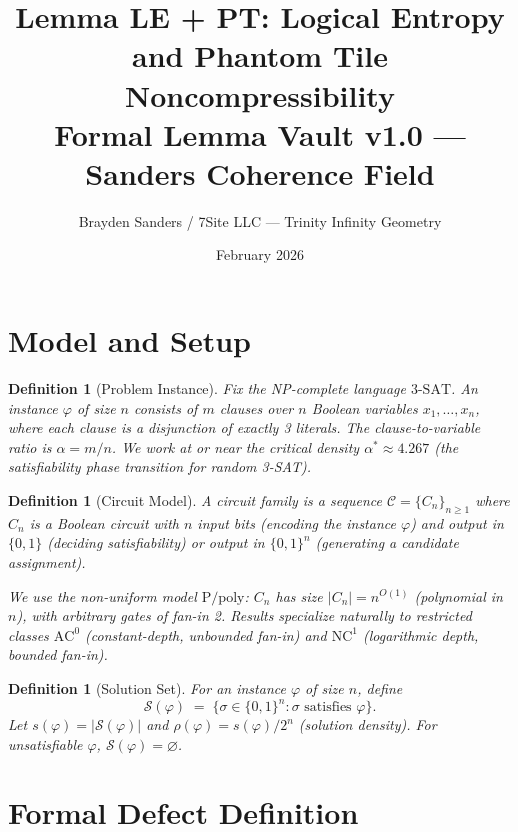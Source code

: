 \documentclass[11pt]{article}
\title{%
  Lemma LE + PT: Logical Entropy and Phantom Tile Noncompressibility\\[4pt]
  \large Formal Lemma Vault v1.0 --- Sanders Coherence Field}
\author{Brayden Sanders / 7Site LLC --- Trinity Infinity Geometry}
\date{February 2026}
\newtheorem{definition}[lemma]{Definition}
\theoremstyle{definition}
\begin{document}
\maketitle

\section{Model and Setup}

\begin{definition}[Problem Instance]
\label{def:instance}
Fix the NP-complete language $\mathrm{3\text{-}SAT}$.
An instance $\varphi$ of size $n$ consists of $m$ clauses over $n$ Boolean variables $x_1, \ldots, x_n$,
where each clause is a disjunction of exactly 3 literals.
The clause-to-variable ratio is $\alpha = m/n$.
We work at or near the critical density $\alpha^* \approx 4.267$ (the satisfiability phase transition for random 3-SAT).
\end{definition}

\begin{definition}[Circuit Model]
\label{def:circuit}
A \emph{circuit family} is a sequence $\mathcal{C} = \{C_n\}_{n \geq 1}$ where $C_n$ is a Boolean circuit
with $n$ input bits (encoding the instance $\varphi$) and output in $\{0,1\}$ (deciding satisfiability)
or output in $\{0,1\}^n$ (generating a candidate assignment).

We use the non-uniform model $\mathrm{P/poly}$: $C_n$ has size $|C_n| = n^{O(1)}$ (polynomial in $n$),
with arbitrary gates of fan-in 2.
Results specialize naturally to restricted classes $\mathrm{AC}^0$ (constant-depth, unbounded fan-in)
and $\mathrm{NC}^1$ (logarithmic depth, bounded fan-in).
\end{definition}

\begin{definition}[Solution Set]
\label{def:solset}
For an instance $\varphi$ of size $n$, define
\[
  \mathcal{S}(\varphi) \;=\; \bigl\{ \sigma \in \{0,1\}^n : \sigma \text{ satisfies } \varphi \bigr\}.
\]
Let $s(\varphi) = |\mathcal{S}(\varphi)|$ and $\rho(\varphi) = s(\varphi) / 2^n$ (solution density).
For unsatisfiable $\varphi$, $\mathcal{S}(\varphi) = \varnothing$.
\end{definition}

\section{Formal Defect Definition}
\end{document}
